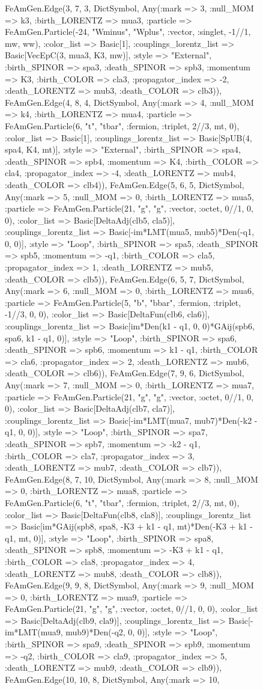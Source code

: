 \documentclass{revtex4}
\begin{document}
\begin{figure}[!htb]
\begin{center}
{FeAmGen.Edge(3, 7, 3, Dict{Symbol, Any}(:mark => 3, :null_MOM => k3, :birth_LORENTZ => mua3, :particle => FeAmGen.Particle(-24, "Wminus", "Wplus", :vector, :singlet, -1//1, mw, ww), :color_list => Basic[1], :couplings_lorentz_list => Basic[VecEpC(3, mua3, K3, mw)], :style => "External", :birth_SPINOR => spa3, :death_SPINOR => spb3, :momentum => K3, :birth_COLOR => cla3, :propagator_index => -2, :death_LORENTZ => mub3, :death_COLOR => clb3)), FeAmGen.Edge(4, 8, 4, Dict{Symbol, Any}(:mark => 4, :null_MOM => k4, :birth_LORENTZ => mua4, :particle => FeAmGen.Particle(6, "t", "tbar", :fermion, :triplet, 2//3, mt, 0), :color_list => Basic[1], :couplings_lorentz_list => Basic[SpUB(4, spa4, K4, mt)], :style => "External", :birth_SPINOR => spa4, :death_SPINOR => spb4, :momentum => K4, :birth_COLOR => cla4, :propagator_index => -4, :death_LORENTZ => mub4, :death_COLOR => clb4)), FeAmGen.Edge(5, 6, 5, Dict{Symbol, Any}(:mark => 5, :null_MOM => 0, :birth_LORENTZ => mua5, :particle => FeAmGen.Particle(21, "g", "g", :vector, :octet, 0//1, 0, 0), :color_list => Basic[DeltaAdj(clb5, cla5)], :couplings_lorentz_list => Basic[-im*LMT(mua5, mub5)*Den(-q1, 0, 0)], :style => "Loop", :birth_SPINOR => spa5, :death_SPINOR => spb5, :momentum => -q1, :birth_COLOR => cla5, :propagator_index => 1, :death_LORENTZ => mub5, :death_COLOR => clb5)), FeAmGen.Edge(6, 5, 7, Dict{Symbol, Any}(:mark => 6, :null_MOM => 0, :birth_LORENTZ => mua6, :particle => FeAmGen.Particle(5, "b", "bbar", :fermion, :triplet, -1//3, 0, 0), :color_list => Basic[DeltaFun(clb6, cla6)], :couplings_lorentz_list => Basic[im*Den(k1 - q1, 0, 0)*GAij(spb6, spa6, k1 - q1, 0)], :style => "Loop", :birth_SPINOR => spa6, :death_SPINOR => spb6, :momentum => k1 - q1, :birth_COLOR => cla6, :propagator_index => 2, :death_LORENTZ => mub6, :death_COLOR => clb6)), FeAmGen.Edge(7, 9, 6, Dict{Symbol, Any}(:mark => 7, :null_MOM => 0, :birth_LORENTZ => mua7, :particle => FeAmGen.Particle(21, "g", "g", :vector, :octet, 0//1, 0, 0), :color_list => Basic[DeltaAdj(clb7, cla7)], :couplings_lorentz_list => Basic[-im*LMT(mua7, mub7)*Den(-k2 - q1, 0, 0)], :style => "Loop", :birth_SPINOR => spa7, :death_SPINOR => spb7, :momentum => -k2 - q1, :birth_COLOR => cla7, :propagator_index => 3, :death_LORENTZ => mub7, :death_COLOR => clb7)), FeAmGen.Edge(8, 7, 10, Dict{Symbol, Any}(:mark => 8, :null_MOM => 0, :birth_LORENTZ => mua8, :particle => FeAmGen.Particle(6, "t", "tbar", :fermion, :triplet, 2//3, mt, 0), :color_list => Basic[DeltaFun(clb8, cla8)], :couplings_lorentz_list => Basic[im*GAij(spb8, spa8, -K3 + k1 - q1, mt)*Den(-K3 + k1 - q1, mt, 0)], :style => "Loop", :birth_SPINOR => spa8, :death_SPINOR => spb8, :momentum => -K3 + k1 - q1, :birth_COLOR => cla8, :propagator_index => 4, :death_LORENTZ => mub8, :death_COLOR => clb8)), FeAmGen.Edge(9, 9, 8, Dict{Symbol, Any}(:mark => 9, :null_MOM => 0, :birth_LORENTZ => mua9, :particle => FeAmGen.Particle(21, "g", "g", :vector, :octet, 0//1, 0, 0), :color_list => Basic[DeltaAdj(clb9, cla9)], :couplings_lorentz_list => Basic[-im*LMT(mua9, mub9)*Den(-q2, 0, 0)], :style => "Loop", :birth_SPINOR => spa9, :death_SPINOR => spb9, :momentum => -q2, :birth_COLOR => cla9, :propagator_index => 5, :death_LORENTZ => mub9, :death_COLOR => clb9)), FeAmGen.Edge(10, 10, 8, Dict{Symbol, Any}(:mark => 10, }
\end{center}
\end{figure}
\end{document}
